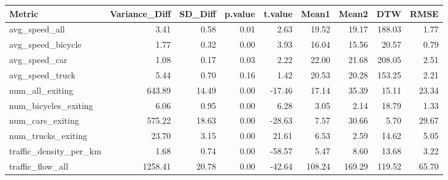 \begin{table}[ht]
\centering
\begin{tabular}{lrrrrrrrr}
  \hline
Metric & Variance\_Diff & SD\_Diff & p.value & t.value & Mean1 & Mean2 & DTW & RMSE \\ 
  \hline
avg\_speed\_all & 3.41 & 0.58 & 0.01 & 2.63 & 19.52 & 19.17 & 188.03 & 1.77 \\ 
  avg\_speed\_bicycle & 1.77 & 0.32 & 0.00 & 3.93 & 16.04 & 15.56 & 20.57 & 0.79 \\ 
  avg\_speed\_car & 1.08 & 0.17 & 0.03 & 2.22 & 22.00 & 21.68 & 208.05 & 2.51 \\ 
  avg\_speed\_truck & 5.44 & 0.70 & 0.16 & 1.42 & 20.53 & 20.28 & 153.25 & 2.21 \\ 
  num\_all\_exiting & 643.89 & 14.49 & 0.00 & -17.46 & 17.14 & 35.39 & 15.11 & 23.34 \\ 
  num\_bicycles\_exiting & 6.06 & 0.95 & 0.00 & 6.28 & 3.05 & 2.14 & 18.79 & 1.33 \\ 
  num\_cars\_exiting & 575.22 & 18.63 & 0.00 & -28.63 & 7.57 & 30.66 & 5.70 & 29.67 \\ 
  num\_trucks\_exiting & 23.70 & 3.15 & 0.00 & 21.61 & 6.53 & 2.59 & 14.62 & 5.05 \\ 
  traffic\_density\_per\_km & 1.68 & 0.74 & 0.00 & -58.57 & 5.47 & 8.60 & 13.68 & 3.22 \\ 
  traffic\_flow\_all & 1258.41 & 20.78 & 0.00 & -42.64 & 108.24 & 169.29 & 119.52 & 65.70 \\ 
   \hline
\end{tabular}
\end{table}
